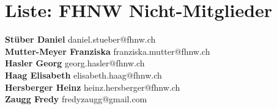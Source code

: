 \documentclass{scrartcl}
\begin{document}
\section*{Liste: FHNW Nicht-Mitglieder}
\textbf{Stüber Daniel  } daniel.stueber@fhnw.ch\\
\textbf{Mutter-Meyer Franziska } franziska.mutter@fhnw.ch\\
\textbf{Hasler Georg } georg.hasler@fhnw.ch\\
\textbf{Haag Elisabeth } elisabeth.haag@fhnw.ch\\
\textbf{Hersberger Heinz } heinz.hersberger@fhnw.ch\\
\textbf{Zaugg Fredy } fredyzaugg@gmail.com\\
\end{document}
